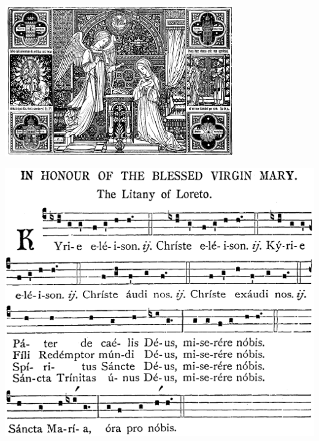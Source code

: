 \documentclass[letterpaper,12pt]{book} %
\begin{document}
\begin{centering}

\includegraphics[width=0.738\textwidth]{../180_clipart.jpg}

\bigskip

\includegraphics[width=\textwidth]{../180.png}

\end{centering}
\end{document}
